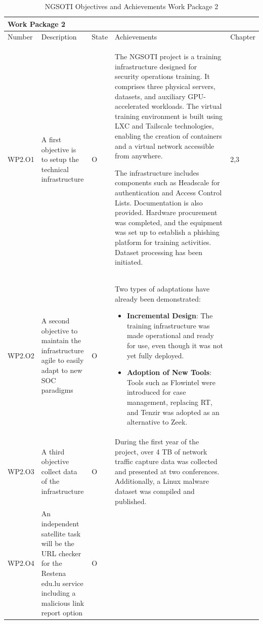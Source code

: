 \begin{table}[h]
\centering

\begin{tabular}{ |p{0.07\linewidth}  |p{0.2\linewidth}|        p{0.04\linewidth}|    p{0.62\linewidth}|  p{0.07\linewidth}|}\hline
\multicolumn{5}{|p{0.97\linewidth}|}{Work Package 2} \\
\hline
                  Number             & Description & State & Achievements & Chapter \\
\hline
WP2.O1 &
A first objective is to setup the technical infrastructure & O &

The NGSOTI project is a training infrastructure designed for security
operations training. It comprises three physical servers, datasets, and
auxiliary GPU-accelerated workloads. The virtual training environment is
built using LXC and Tailscale technologies, enabling the creation of
containers and a virtual network accessible from anywhere.

The infrastructure includes components such as Headscale for authentication
and Access Control Lists. Documentation is also provided. Hardware
procurement was completed, and the equipment was set up to establish a
phishing platform for training activities. Dataset processing has been
initiated.

&
2,3 \\
\hline
WP2.O2 &
A second objective to maintain the infrastructure agile to easily adapt to new
SOC paradigms
&O &
Two types of adaptations have already been demonstrated:
\begin{itemize}
    \item \textbf{Incremental Design}: The training infrastructure was made
    operational and ready for use, even though it was not yet fully deployed.
    \item \textbf{Adoption of New Tools}: Tools such as Flowintel were introduced
    for case management, replacing RT, and Tenzir was adopted as an alternative
    to Zeek.
\end{itemize}

&
\\

\hline

WP2.O3 &
A third objective collect data of the infrastructure
& O &
During the first year of the project, over 4 TB of network traffic capture data was collected and presented at two conferences. Additionally, a Linux malware dataset was compiled and published.
&
\\

\hline

WP2.O4 &
An independent satellite task will be the URL checker for the Restena edu.lu
service including a malicious link report
option
& O &
&
\\
\hline
\end{tabular}
\caption{NGSOTI Objectives and Achievements Work Package 2}
\label{oa2}
\end{table}


